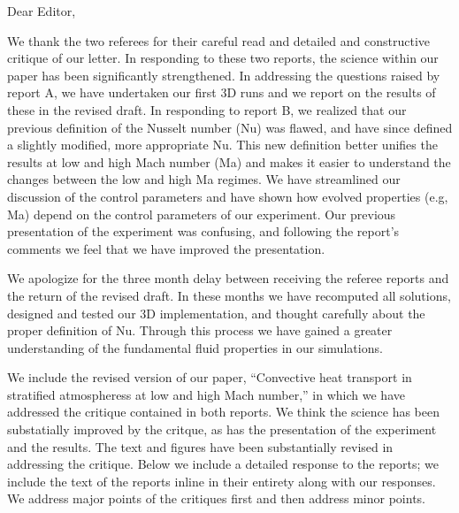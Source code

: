 \documentclass[aps, 11pt, singlecolumn]{revtex4-1} %
\begin{document}
\noindent
Dear Editor,
$\,$\newline

\newenvironment{myquotation}{
\begin{quotation}
\itshape
}{ 
\end{quotation}
}

\begin{singlespace}
We thank the two referees for their careful read and detailed and constructive
critique of our letter.  In responding to these two reports, the science within
our paper has been significantly strengthened.
In addressing the questions raised by report A, we have
undertaken our first 3D runs and we report on the results of these in the
revised draft.  In responding to report B,
we realized that our previous definition of the
Nusselt number (Nu) was flawed, and have since defined
a slightly modified, more appropriate Nu.  This new definition better unifies
the results at low and high Mach number (Ma) and makes it easier to understand
the changes between the low and high Ma regimes. We have streamlined our discussion
of the control parameters and have shown how evolved properties (e.g, Ma) depend
on the control parameters of our experiment.  Our previous presentation of the
experiment was confusing, and following the report's comments we feel that we
have improved the presentation.

We apologize for the three month delay between receiving the referee reports
and the return of the revised draft.  In these months we have
recomputed all solutions, designed and tested our 3D implementation, and
thought carefully about the proper definition of Nu.  Through this
process we have gained a greater understanding of the fundamental
fluid properties in our simulations.  


We include the revised version of our paper, ``Convective heat transport in stratified
atmospheress at low and high Mach number,'' in which we have addressed the critique contained
in both reports.  We think the science has been substatially improved by the critque, as has
the presentation of the experiment and the results.  The text and figures have been substantially
revised in addressing the critique.  
Below we include a detailed response to the reports; we include the text of
the reports inline in their entirety along with our responses.  We address major
points of the critiques first and then address minor points.



\end{singlespace}
\end{document}
